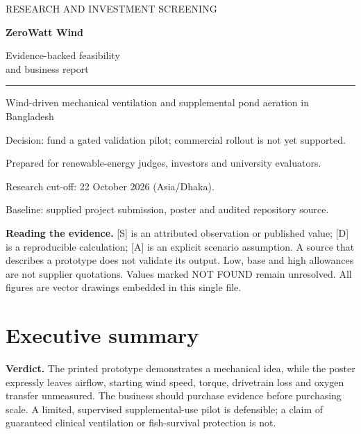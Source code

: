 \documentclass[11pt,a4paper]{article}
\begin{document}
\begin{titlepage}
\vspace*{1.4cm}
{\color{teal}\large RESEARCH AND INVESTMENT SCREENING}\par\vspace{.5cm}
{\Huge\bfseries\color{ink}ZeroWatt Wind}\par\vspace{.5cm}
{\LARGE Evidence-backed feasibility\\and business report}\par\vspace{1cm}
\rule{\linewidth}{1pt}\par
Wind-driven mechanical ventilation and supplemental pond aeration in Bangladesh\par\vspace{.6cm}
{\large Decision: fund a gated validation pilot; commercial rollout is not yet supported.}\par\vspace{1cm}
Prepared for renewable-energy judges, investors and university evaluators.\par
Research cut-off: 22 October 2026 (Asia/Dhaka).\par
Baseline: supplied project submission, poster and audited repository source.\par\vfill
\textbf{Reading the evidence.} [S] is an attributed observation or published value; [D] is a reproducible calculation; [A] is an explicit scenario assumption. A source that describes a prototype does not validate its output. Low, base and high allowances are not supplier quotations. Values marked NOT FOUND remain unresolved. All figures are vector drawings embedded in this single file.\par
\end{titlepage}
\section*{Executive summary}
\textbf{Verdict.} The printed prototype demonstrates a mechanical idea, while the poster expressly leaves airflow, starting wind speed, torque, drivetrain loss and oxygen transfer unmeasured. \cite{poster,project} The business should purchase evidence before purchasing scale. A limited, supervised supplemental-use pilot is defensible; a claim of guaranteed clinical ventilation or fish-survival protection is not.
\end{document}
